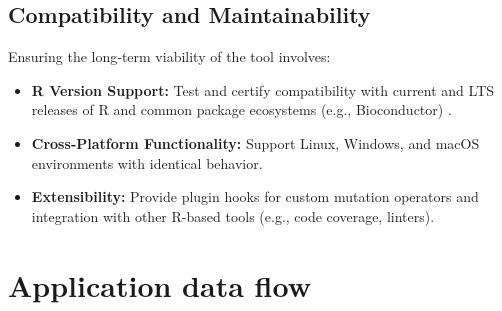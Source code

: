 \subsection{Compatibility and Maintainability}
Ensuring the long‐term viability of the tool involves:
\begin{itemize}
  \item \textbf{R Version Support:} Test and certify compatibility with current and LTS releases of R and common package ecosystems (e.g., Bioconductor) \cite{gentleman2004bioconductor}.
  \item \textbf{Cross‐Platform Functionality:} Support Linux, Windows, and macOS environments with identical behavior.
  \item \textbf{Extensibility:} Provide plugin hooks for custom mutation operators and integration with other R-based tools (e.g., code coverage, linters).
\end{itemize}

\section{Application data flow}


